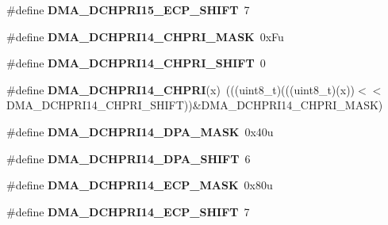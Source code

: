 \begin{DoxyCompactItemize}
\item 
\#define {\bfseries D\+M\+A\+\_\+\+D\+C\+H\+P\+R\+I15\+\_\+\+E\+C\+P\+\_\+\+S\+H\+I\+FT}~7\hypertarget{group__DMA__Register__Masks_ga54aaf25e501504bf8a36a571670118c2}{}\label{group__DMA__Register__Masks_ga54aaf25e501504bf8a36a571670118c2}

\item 
\#define {\bfseries D\+M\+A\+\_\+\+D\+C\+H\+P\+R\+I14\+\_\+\+C\+H\+P\+R\+I\+\_\+\+M\+A\+SK}~0x\+Fu\hypertarget{group__DMA__Register__Masks_ga908ef8df8e7d76968f5aec7100551634}{}\label{group__DMA__Register__Masks_ga908ef8df8e7d76968f5aec7100551634}

\item 
\#define {\bfseries D\+M\+A\+\_\+\+D\+C\+H\+P\+R\+I14\+\_\+\+C\+H\+P\+R\+I\+\_\+\+S\+H\+I\+FT}~0\hypertarget{group__DMA__Register__Masks_ga160b69c2c8a275120fefd8970b4731f5}{}\label{group__DMA__Register__Masks_ga160b69c2c8a275120fefd8970b4731f5}

\item 
\#define {\bfseries D\+M\+A\+\_\+\+D\+C\+H\+P\+R\+I14\+\_\+\+C\+H\+P\+RI}(x)~(((uint8\+\_\+t)(((uint8\+\_\+t)(x))$<$$<$D\+M\+A\+\_\+\+D\+C\+H\+P\+R\+I14\+\_\+\+C\+H\+P\+R\+I\+\_\+\+S\+H\+I\+FT))\&D\+M\+A\+\_\+\+D\+C\+H\+P\+R\+I14\+\_\+\+C\+H\+P\+R\+I\+\_\+\+M\+A\+SK)\hypertarget{group__DMA__Register__Masks_ga24845399db7f9ae5525e83c66afb7223}{}\label{group__DMA__Register__Masks_ga24845399db7f9ae5525e83c66afb7223}

\item 
\#define {\bfseries D\+M\+A\+\_\+\+D\+C\+H\+P\+R\+I14\+\_\+\+D\+P\+A\+\_\+\+M\+A\+SK}~0x40u\hypertarget{group__DMA__Register__Masks_ga73cb4f5a8c28574c6d7b9548811bde25}{}\label{group__DMA__Register__Masks_ga73cb4f5a8c28574c6d7b9548811bde25}

\item 
\#define {\bfseries D\+M\+A\+\_\+\+D\+C\+H\+P\+R\+I14\+\_\+\+D\+P\+A\+\_\+\+S\+H\+I\+FT}~6\hypertarget{group__DMA__Register__Masks_ga1dd167f78a3ed39d0858085f54286371}{}\label{group__DMA__Register__Masks_ga1dd167f78a3ed39d0858085f54286371}

\item 
\#define {\bfseries D\+M\+A\+\_\+\+D\+C\+H\+P\+R\+I14\+\_\+\+E\+C\+P\+\_\+\+M\+A\+SK}~0x80u\hypertarget{group__DMA__Register__Masks_gadcb3065c2c242e3728282cb36d891952}{}\label{group__DMA__Register__Masks_gadcb3065c2c242e3728282cb36d891952}

\item 
\#define {\bfseries D\+M\+A\+\_\+\+D\+C\+H\+P\+R\+I14\+\_\+\+E\+C\+P\+\_\+\+S\+H\+I\+FT}~7\hypertarget{group__DMA__Register__Masks_gaa7495718e9a8dc1cf79def8e6053472f}{}\label{group__DMA__Register__Masks_gaa7495718e9a8dc1cf79def8e6053472f}


\end{DoxyCompactItemize}
